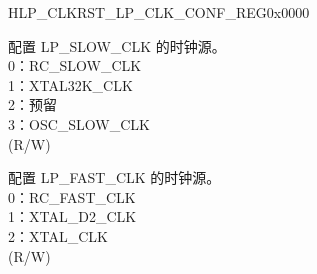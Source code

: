 \begin{register}{H}{LP\_CLKRST\_LP\_CLK\_CONF\_REG}{0x0000}\label{regdesc:LPCLKRSTLPCLKCONFREG}
%
%
%
%
\regnewline%
\begin{regdesc}\begin{reglist}
\label{fielddesc:LPCLKRSTSLOWCLKSEL}\item [LP\_CLKRST\_SLOW\_CLK\_SEL] 配置 LP\_SLOW\_CLK 的时钟源。\\
0：RC\_SLOW\_CLK \\
1：XTAL32K\_CLK \\
2：预留 \\
3：OSC\_SLOW\_CLK \\(R/W)
\label{fielddesc:LPCLKRSTFASTCLKSEL}\item [LP\_CLKRST\_FAST\_CLK\_SEL] 配置 LP\_FAST\_CLK 的时钟源。\\
0：RC\_FAST\_CLK \\
1：XTAL\_D2\_CLK \\
2：XTAL\_CLK \\ (R/W)
\end{reglist}\end{regdesc}
\end{register}


